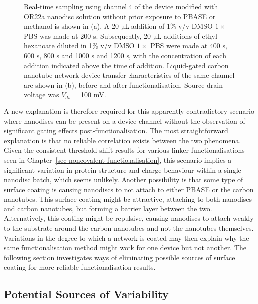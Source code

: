 \documentclass[
  a4paper,
]{scrbook}
\begin{document}
\begin{figure}
\begin{minipage}[t]{0.01\linewidth}
{}

\end{minipage}%

\caption[Real-time sampling using a channel modified with OR22a nanodisc
solution without prior exposure to PBASE or methanol, alongside
liquid-gated transfer characteristics of the same
channel.]{\label{fig-OR22a-variability-noPBASE}Real-time sampling using
channel 4 of the device modified with OR22a nanodisc solution without
prior exposure to PBASE or methanol is shown in (a). A 20 µL addition of
1\% v/v DMSO \(1 \times\) PBS was made at 200 s. Subsequently, 20 µL
additions of ethyl hexanoate diluted in 1\% v/v DMSO \(1 \times\) PBS
were made at 400 s, 600 s, 800 s and 1000 s and 1200 s, with the
concentration of each addition indicated above the time of addition.
Liquid-gated carbon nanotube network device transfer characteristics of
the same channel are shown in (b), before and after functionalisation.
Source-drain voltage was \(V_{ds}\) = 100 mV.}

\end{figure}

A new explanation is therefore required for this apparently
contradictory scenario where nanodiscs can be present on a device
channel without the observation of significant gating effects
post-functionalisation. The most straightforward explanation is that no
reliable correlation exists between the two phenomena. Given the
consistent threshold shift results for various linker functionalisations
seen in Chapter~\ref{sec-noncovalent-functionalisation}, this scenario
implies a significant variation in protein structure and charge
behaviour within a single nanodisc batch, which seems unlikely. Another
possibility is that some type of surface coating is causing nanodiscs to
not attach to either PBASE or the carbon nanotubes. This surface coating
might be attractive, attaching to both nanodiscs and carbon nanotubes,
but forming a barrier layer between the two. Alternatively, this coating
might be repulsive, causing nanodiscs to attach weakly to the substrate
around the carbon nanotubes and not the nanotubes themselves. Variations
in the degree to which a network is coated may then explain why the same
functionalisation method might work for one device but not another. The
following section investigates ways of eliminating possible sources of
surface coating for more reliable functionalisation results.

\hypertarget{sec-contamination}{%
\subsection{Potential Sources of Variability}\label{sec-contamination}}
\end{document}
